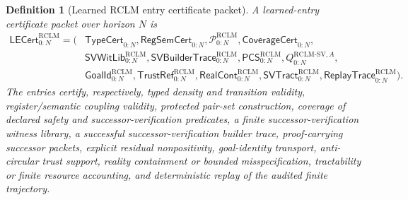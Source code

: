 \documentclass[11pt,a4paper]{article}
\newtheorem{definition}[theorem]{Definition}
\newcommand{\Pcal}{\mathcal P}
\newcommand{\RCLM}{\mathrm{RCLM}}
\begin{document}
\begin{definition}[Learned RCLM entry certificate packet]
\label{def:rclm-m3min-learned-entry-certificate}
A learned-entry certificate packet over horizon $N$ is
\[
\begin{aligned}
\mathsf{LECert}_{0:N}^{\RCLM}=(&
\mathsf{TypeCert}_{0:N},
\mathsf{RegSemCert}_{0:N},
\Pcal_{0:N}^{\RCLM},
\mathsf{CoverageCert}_{0:N},\\
&\mathsf{SVWitLib}_{0:N}^{\RCLM},
\mathsf{SVBuilderTrace}_{0:N}^{\RCLM},
\mathsf{PCS}_{0:N}^{\RCLM},
Q_{0:N}^{\RCLM\text{-}\mathrm{SV},A},\\
&\mathsf{GoalId}_{0:N}^{\RCLM},
\mathsf{TrustRef}_{0:N}^{\RCLM},
\mathsf{RealCont}_{0:N}^{\RCLM},
\mathsf{SVTract}_{0:N}^{\RCLM},
\mathsf{ReplayTrace}_{0:N}^{\RCLM}).
\end{aligned}
\]
The entries certify, respectively, typed density and transition validity, register/semantic coupling validity, protected pair-set construction, coverage of declared safety and successor-verification predicates, a finite successor-verification witness library, a successful successor-verification builder trace, proof-carrying successor packets, explicit residual nonpositivity, goal-identity transport, anti-circular trust support, reality containment or bounded misspecification, tractability or finite resource accounting, and deterministic replay of the audited finite trajectory.
\end{definition}
\end{document}
